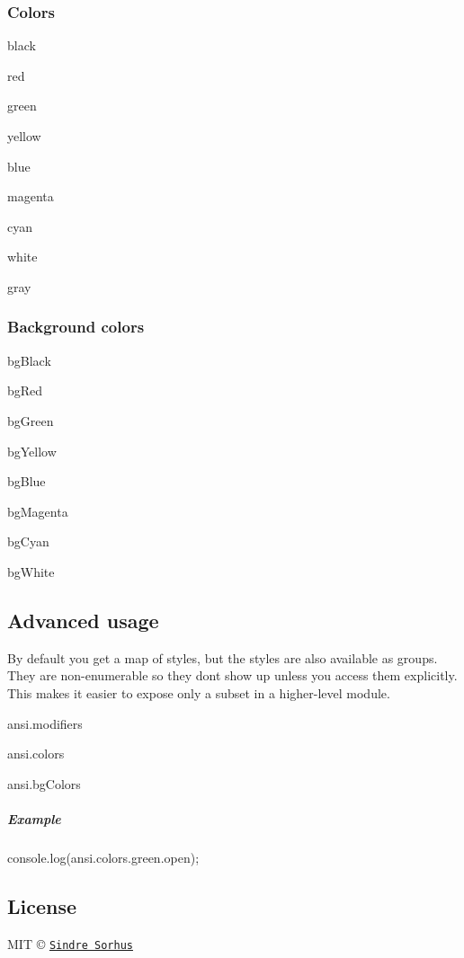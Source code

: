 \subsubsection*{Colors}


\begin{DoxyItemize}
\item {\ttfamily black}
\item {\ttfamily red}
\item {\ttfamily green}
\item {\ttfamily yellow}
\item {\ttfamily blue}
\item {\ttfamily magenta}
\item {\ttfamily cyan}
\item {\ttfamily white}
\item {\ttfamily gray}
\end{DoxyItemize}

\subsubsection*{Background colors}


\begin{DoxyItemize}
\item {\ttfamily bg\+Black}
\item {\ttfamily bg\+Red}
\item {\ttfamily bg\+Green}
\item {\ttfamily bg\+Yellow}
\item {\ttfamily bg\+Blue}
\item {\ttfamily bg\+Magenta}
\item {\ttfamily bg\+Cyan}
\item {\ttfamily bg\+White}
\end{DoxyItemize}

\subsection*{Advanced usage}

By default you get a map of styles, but the styles are also available as groups. They are non-\/enumerable so they don\textquotesingle{}t show up unless you access them explicitly. This makes it easier to expose only a subset in a higher-\/level module.


\begin{DoxyItemize}
\item {\ttfamily ansi.\+modifiers}
\item {\ttfamily ansi.\+colors}
\item {\ttfamily ansi.\+bg\+Colors}
\end{DoxyItemize}

\subparagraph*{Example}


\begin{DoxyCode}
console.log(ansi.colors.green.open);
\end{DoxyCode}


\subsection*{License}

M\+I\+T © \href{http://sindresorhus.com}{\tt Sindre Sorhus} 